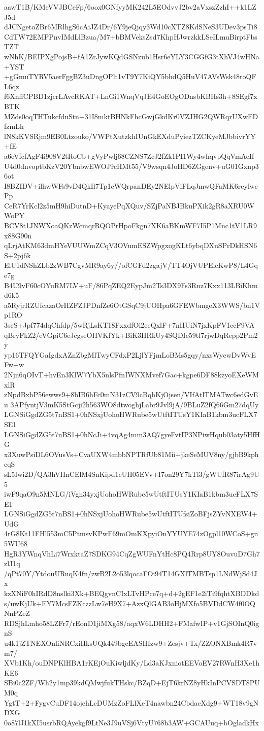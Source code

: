 aawT1B/KMeVVJBCeFp/6oox0GNfyyMK242L5EOdvvJ2bv2aVxszZzhI++k1LZJ5d
dJCNgetoZBr6MRlhgS6cAiJZ4Dr/6Y9jeQjqy3Wd10cXTZ8KdSNeS3UDev3psTi8
CdTW72EMPPnvIMdLlBzua/M7+bBMVeksZsd7KhpHJwrzkkLSeILmuBirptFbsTZT
wNhK/BEIPXgPojsB+fA1ZrJywKQdGSNzub1Hsr6eYLY3CGGfG3tXhVJ4wHNa+YST
+gGmuTYRV5aerFggBZ3uDngOPlt1vT9Y7KiQY5bhdQ5HuV47AVsWsk48roQFL6qz
f6XnffCPBD1zjcrLAvcRKAT+LnGi1WnqVqJE4GoEOgODnsbKBHs3h+8SEgf7xBTK
MZds0oqTHTukcfduStn+31I8mktBHNkFhcGwjGkdKr0VZJHG2QWRqrUXwEDfzmLh
lN8kKVSRjm9EB0Ltzouko/VWPtXutzkhIUnGkEXduPyiezTZCKyeMJbbivrYY+fE
a6eVfcfAgF4i908V2tRoCb+gVyPwlj68CZNS7ZcJ2fZk1PI1Wy4whqvpQqVmAeIf
U4d0dnvoptbKzV20YbnbwEWOJ9cHMt55/V9wsqn4JoHD6ZGgenv+uG01Gxnp36ot
I8BZIDV+ilhwWFs9vD4QkIl7Tp1cWQrpanDEy2NElpViFLqJmwQFaMK6reylwcPp
CeR7YrKcl2z5mH9hiDutnD+KyayePqXQuv/SZjPaNBJBkuPXik2gR8aXRU0WWoPY
BCV8t1JNWXoaQKzWcmqrRQOPrHpoFkgn7XK6aBKmWF7I5P1Mnc1tV1LR9x88G90n
qLrjAtKM63dmHYeVUUWmZCqV3OVumESZWpgxogKLt6ybqDXuSPrDkHSN6S+2pj6k
ElU1dNShZLb2zWB7CgvMR9ay6y//ofCGFd2zgajV/TT4OjVUPElcKwP8/L4Gqe7g
B4U9vF60cOYuRM7LV+uF/86PqZEQ2EypJm2Ts3DX9Fs3Rnz7Kxx113LBiKhmd6k5
a5RyjrRZUfcazaOrHZFZJPDnfZe6OtGSqC9jUOHpa6GFEWbmgeX3WWS/bn1Vp1RO
3scS+Jpf774dqChfdp/5wRjLsKT18FxxdfOi2eeQxlF+7nHUiN7jxKpFV1ccF9VA
qBryFkZ2/eVGpiC6eJcgseOHVKfYk+BiK3HRkUy4SQDIe59tl7rjwDqRepp2Pm2y
yp16TFQYGaIgdxAZnZbgMlTwyCFdxP2LjlYFjmLoBMs5gqy/nxsWycwDvWvEFw+w
2Njn6qOIvT+hvEn3KlW7YbX5nlsPfnIWNXMvef7Gac+kgpe6DF88kzyoEXeWMxlR
zNpdBxbP56ewws9+8bIB6hFc0mN31zCV9cBqhKjOjsen/VIfAtlTMATwc6edGvEu
3APfyntjV3mK5StGcji2h563WO8dtwoghjLabr9Jvl9jA/9BLuZ2fQ66Gm27dqUy
LGNSiGgdZG5t7nBS1+0hNSxjUohoHWRube5wUtftITUsY1KIaB1kbm3ucFLX7SE1
LGNSiGgdZG5t7nBS1+0hNcJi+4vqAg4mm3AQ7gyeFvtIP3NPiwHqub03aty5HfHG
x3XuwPsiDL6OVusVs+CvaUXW4mbbNPTRfUb81Mii+jkeSeMUV8ny/gjbB9kphcqS
sL5Iwi2D/QA3hVHnCElM4SnKipd1cUH05EVv+I7on29Y7kTl3/gWUfR87irAg9U5
iwF9qaO9n5MNLG/iVgn34yxjUohoHWRube5wUtftITUsY1KIaB1kbm3ucFLX7SE1
LGNSiGgdZG5t7nBS1+0hNSxjUohoHWRube5wUtftITUfsiZoBFjsZYvNXEW4+UdG
4rG8Kt11FHl553mC5PtmsvKPwF69mOmKXpyiOnYYUYE74zOgpl10WCoS+gn5WU68
HgR3YWnqVhLi7WrxktaZ7SDKG94CqZgWUFnYtHc8PQ4Rrp8UY8OuvuD7Gh7zlJ1q
/qPt70Y/YtdouURuqK4fn/zwB2L2o53lqocaFOi94T14GXlTMBTsp1LNdWjSd4Jx
kzXNiF0hIRdD8nslki3Xk+BEQgvnCIxLTvHPce7q+d+2gEF1e2iTi9fqhtXBDDkd
s/uwKjUk+EY7McsFZKczzLw7eH9X7+AzxQlGAB3oHjMXfo5BVDdCW4f0OQNnPZeZ
RDSjhLmho58LZFr7/rEonD1jiMXg58/aqxW6LDHH2+FMafwIP+v1GjSOInQ0ignS
u4k1jZTNEXOnliNRCxiHksUQk449bgcEASIHzw9+Zesjv+Tx/ZZONXBmk4R7vm7/
XVb1Kh/ouDNPKlHBA1rKEjOuKiwljdKy/Ld3aKJxniotEEVoEV27RWnH3Xe1hKE6
SBi0c2ZF/Wh2y1mp39kdQMwjfukTHskc/BZqD+EjT6krNZ8yHkInPCVSDT8PUM0q
YgtT+2+FygvCuDF14ojehLcDUMzZoFLlXeT4nawbn24CbdacXdg9+WT18v9gNDXG
0o87lJ1kXI5usrbRQAyekgf9LtNe3J9uVSj6VtyU768b3AW+GCAUuq+bOgladkHx
